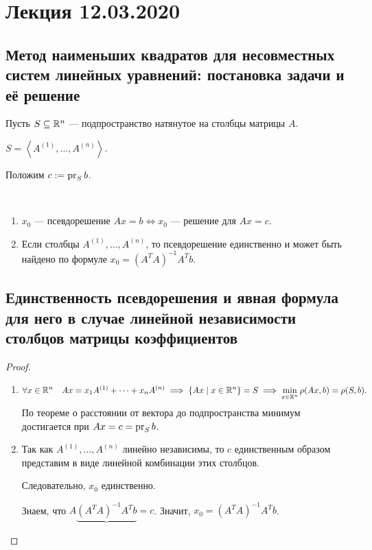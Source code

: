 \section{Лекция 12.03.2020} 

\subsection{Метод наименьших квадратов для несовместных систем линейных уравнений: постановка задачи и её решение}

Пусть $S \subseteq \mathbb{R}^n$ --- подпространство натянутое на столбцы матрицы $A$.

$S = \left< A^{(1)}, \dots, A^{(n)} \right>$.

Положим $c := \operatorname{\mathop{\mathrm{pr}}}_S b$.

\begin{proposal}~
    \begin{enumerate}
    \item $x_0$ --- псевдорешение $Ax = b \iff x_0$ --- решение для $Ax = c$.  
    \item Если столбцы $A^{(1)}, \dots, A^{(n)}$, то псевдорешение единственно и может быть найдено по формуле $x_0 = (A^{T} A)^{-1} A^{T} b$.
    \end{enumerate}
\end{proposal}


\subsection{Единственность псевдорешения и явная формула для него в случае линейной независимости столбцов матрицы коэффициентов}

\begin{proof}~
    \begin{enumerate}
        \item
            \begin{equation*}
                \forall x \in \mathbb{R}^n \quad Ax = x_1 A^{(1)} + \dots + x_n A^{(n)} \implies \{Ax \mid x \in \mathbb{R}^n\} = S \implies \min_{x \in \mathbb{R}^n} \rho(Ax, b) = \rho(S, b)
            .\end{equation*}
            По теореме о расстоянии от вектора до подпространства минимум достигается при $Ax = c = \operatorname{\mathop{\mathrm{pr}}}_S b$.

        \item
            Так как $A^{(1)}, \dots, A^{(n)}$ линейно независимы, то $c$ единственным образом представим в виде линейной комбинации этих столбцов.

            Следовательно, $x_0$ единственно.

            Знаем, что $A \underbrace{(A^{T} A)^{-1} A^{T} b} = c$. Значит, $x_0 = (A^{T} A)^{-1} A^{T} b$.
            \qedhere
    \end{enumerate}
\end{proof}

